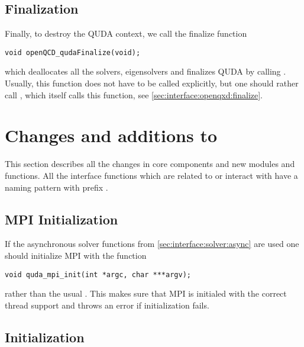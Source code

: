 \subsection{Finalization}
\label{sec:interface:quda:finalize}


Finally, to destroy the QUDA context, we call the finalize function
\begin{verbatim}
void openQCD_qudaFinalize(void);
\end{verbatim}
which deallocates all the solvers, eigensolvers and finalizes QUDA by calling . Usually, this function does not have to be called explicitly, but one should rather call , which itself calls this function, see \cref{sec:interface:openqxd:finalize}.

\section{Changes and additions to \openqxd}
\label{sec:interface:openqxd}

This section describes all the changes in \openqxd core components and new modules and functions.
All the interface functions which are related to or interact with \quda have a naming pattern with prefix .


\subsection{MPI Initialization}
\label{sec:interface:openqxd:mpi:init}


If the asynchronous solver functions from \cref{sec:interface:solver:async} are used one should initialize MPI with the function
\begin{verbatim}
void quda_mpi_init(int *argc, char ***argv);
\end{verbatim}
rather than the usual . This makes sure that MPI is initialed with the correct thread support and throws an error if initialization fails.

\subsection{Initialization}
\label{sec:interface:openqxd:init}

